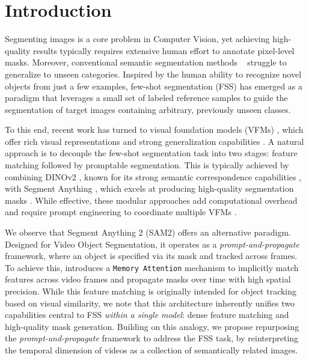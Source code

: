     \section{Introduction}
\label{sec:intro}

Segmenting images is a core problem in Computer Vision, yet achieving high-quality results typically requires extensive human effort to annotate pixel-level masks. Moreover, conventional semantic segmentation methods ~\cite{chen2017deeplab, he2017mask, kirillov2018panoptic, cheng2022masked} struggle to generalize to unseen categories. Inspired by the human ability to recognize novel objects from just a few examples, few-shot segmentation (FSS) \cite{li2021adaptive, wang2019panet, liu2022learning,  shaban2017one} has emerged as a paradigm that leverages a small set of labeled reference samples to guide the segmentation of target images containing arbitrary, previously unseen classes.

To this end, recent work has turned to visual foundation models (VFMs) \cite{bommasani2021opportunities}, which offer rich visual representations and strong generalization capabilities \cite{radford2021clip, yuan2023power}. A natural approach \cite{liu2023matcher, zhang2024bridge, sun2024vrp} is to decouple the few-shot segmentation task into two stages: feature matching followed by promptable segmentation. This is typically achieved by combining DINOv2 \cite{oquab2023dinov2}, known for its strong semantic correspondence capabilities \cite{zhang2023tale, meng2024segic, zhang2024telling, tang2023emergent}, with Segment Anything  \cite{kirillov2023segment}, which excels at producing high-quality segmentation masks \cite{kirillov2023segment, zou2023segment, zhang2023personalize}. While effective,
these modular approaches add computational overhead and require prompt engineering to coordinate multiple VFMs \cite{zhu2024unleashing}. 

We observe that Segment Anything 2 (SAM2) \cite{ravi2024sam} offers an alternative paradigm.
Designed for Video Object Segmentation, it operates as a \textit{prompt-and-propagate} framework, where an object is specified via its mask and tracked across frames. 
To achieve this, \sam{} introduces a \texttt{Memory Attention} mechanism to implicitly match features across video frames and propagate masks over time with high spatial precision. While this feature matching is originally intended for object tracking based on visual similarity, we note that this architecture inherently unifies two capabilities central to FSS \textit{within a single model}: dense feature matching and high-quality mask generation. Building on this analogy, we propose repurposing the \textit{prompt-and-propagate} framework to address the FSS task, by reinterpreting the temporal dimension of videos as a collection of semantically related images.



